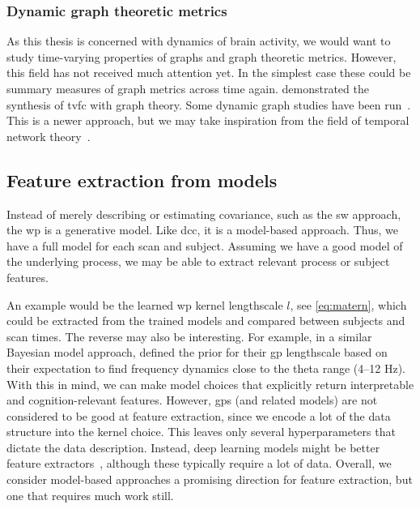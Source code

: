 \subsubsection{Dynamic graph theoretic metrics}

As this thesis is concerned with dynamics of brain activity, we would want to study time-varying properties of graphs and graph theoretic metrics.
However, this field has not received much attention yet.
%
In the simplest case these could be summary measures of graph metrics across time again.
\textcite{Zalesky2014} demonstrated the synthesis of \gls{tvfc} with graph theory.
Some dynamic graph studies have been run~\parencite{Bassett2011, Bassett2013}.
This is a newer approach, but we may take inspiration from the field of temporal network theory~\parencite{Holme2012, Yu2015, Thompson2017}.

\subsection{Feature extraction from models}\label{subsec:model-features}

Instead of merely describing or estimating covariance, such as the \gls{sw} approach, the \gls{wp} is a generative model.
Like \gls{dcc}, it is a model-based approach.
Thus, we have a full model for each scan and subject.
Assuming we have a good model of the underlying process, we may be able to extract relevant process or subject features.

An example would be the learned \gls{wp} kernel lengthscale $l$, see \cref{eq:matern}, which could be extracted from the trained models and compared between subjects and scan times.
The reverse may also be interesting.
For example, in a similar Bayesian model approach, \textcite{Li2019a} defined the prior for their \gls{gp} lengthscale based on their expectation to find frequency dynamics close to the theta range (4--12 Hz).
%
With this in mind, we can make model choices that explicitly return interpretable and cognition-relevant features.
However, \glspl{gp} (and related models) are not considered to be good at feature extraction, since we encode a lot of the data structure into the kernel choice.
This leaves only several hyperparameters that dictate the data description.
Instead, deep learning models might be better feature extractors~\parencite[and have proven useful in other neuroscientific fields, see e.g.][]{Richards2019}, although these typically require a lot of data.
Overall, we consider model-based approaches a promising direction for feature extraction, but one that requires much work still.
